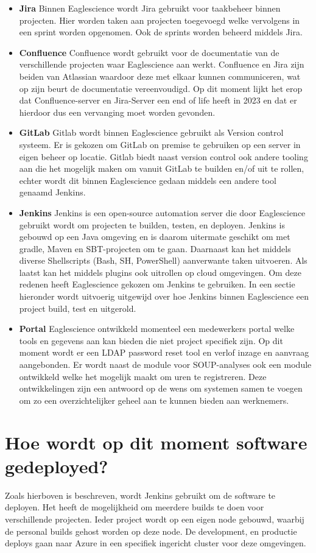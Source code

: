 \begin{itemize}
    \item \textbf{Jira}
    Binnen Eaglescience wordt Jira gebruikt voor taakbeheer binnen projecten. Hier worden taken aan projecten toegevoegd welke vervolgens in een sprint worden opgenomen. Ook de sprints worden beheerd middels Jira.
    \item \textbf{Confluence}
    Confluence wordt gebruikt voor de documentatie van de verschillende projecten waar Eaglescience aan werkt. Confluence en Jira zijn beiden van Atlassian waardoor deze met elkaar kunnen communiceren, wat op zijn beurt de documentatie vereenvoudigd. Op dit moment lijkt het erop dat Confluence-server en Jira-Server een end of life heeft in 2023 en dat er hierdoor dus een vervanging moet worden gevonden.
    \item \textbf{GitLab}
    Gitlab wordt binnen Eaglescience gebruikt als Version control systeem. Er is gekozen om GitLab on premise te gebruiken op een server in eigen beheer op locatie. Gitlab biedt naast version control ook andere tooling aan die het mogelijk maken om vanuit GitLab te builden en/of uit te rollen, echter wordt dit binnen Eaglescience gedaan middels een andere tool genaamd Jenkins.
    \item \textbf{Jenkins}
    Jenkins is een open-source automation server die door Eaglescience gebruikt wordt om projecten te builden, testen, en deployen. Jenkins is gebouwd op een Java omgeving en is daarom uitermate geschikt om met gradle, Maven en SBT-projecten om te gaan. Daarnaast kan het middels diverse Shellscripts (Bash, SH, PowerShell) aanverwante taken uitvoeren. Als laatst kan het middels plugins ook uitrollen op cloud omgevingen. Om deze redenen heeft Eaglescience gekozen om Jenkins te gebruiken. In een sectie hieronder wordt uitvoerig uitgewijd over hoe Jenkins binnen Eaglescience een project build, test en uitgerold.
    \item \textbf{Portal}
    Eaglescience ontwikkeld momenteel een medewerkers portal welke tools en gegevens aan kan bieden die niet project specifiek zijn. Op dit moment wordt er een LDAP password reset tool en verlof inzage en aanvraag aangebonden. Er wordt naast de module voor SOUP-analyses ook een module ontwikkeld welke het mogelijk maakt om uren te registreren. Deze ontwikkelingen zijn een antwoord op de wens om systemen samen te voegen om zo een overzichtelijker geheel aan te kunnen bieden aan werknemers.
\end{itemize}

\section{Hoe wordt op dit moment software gedeployed?} \label{sec:hoe-wordt-op-dit-moment-software-gedeployed?}
Zoals hierboven is beschreven, wordt Jenkins gebruikt om de software te deployen. Het heeft de mogelijkheid om meerdere builds te doen voor verschillende projecten. Ieder project wordt op een eigen node gebouwd, waarbij de personal builds gehost worden op deze node. De development, en productie deploys gaan naar Azure in een specifiek ingericht cluster voor deze omgevingen.

